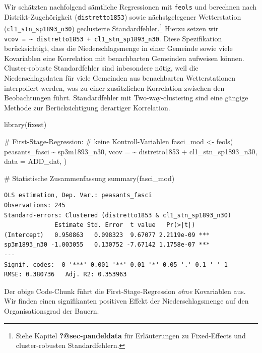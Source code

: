 \documentclass[
  a4paper,
  DIV=11,
  oneside]{scrreprt}
\newenvironment{Shaded}{\begin{snugshade}}{\end{snugshade}}
\newcommand{\AttributeTok}[1]{\textcolor[rgb]{0.40,0.45,0.13}{#1}}
\newcommand{\CommentTok}[1]{\textcolor[rgb]{0.37,0.37,0.37}{#1}}
\newcommand{\FunctionTok}[1]{\textcolor[rgb]{0.28,0.35,0.67}{#1}}
\newcommand{\NormalTok}[1]{\textcolor[rgb]{0.00,0.23,0.31}{#1}}
\newcommand{\OtherTok}[1]{\textcolor[rgb]{0.00,0.23,0.31}{#1}}
\newcommand{\SpecialCharTok}[1]{\textcolor[rgb]{0.37,0.37,0.37}{#1}}
\begin{document}
Wir schätzten nachfolgend sämtliche Regressionen mit \texttt{feols} und
berechnen nach Distrikt-Zugehörigkeit (\texttt{distretto1853}) sowie
nächstgelegener Wetterstation (\texttt{cl1\_stn\_sp1893\_n30})
geclusterte Standardfehler.\footnote{Siehe Kapitel
  \textbf{?@sec-pandeldata} für Erläuterungen zu Fixed-Effects und
  cluster-robusten Standardfehlern.} Hierzu setzen wir
\texttt{vcov\ =\ \textasciitilde{}\ distretto1853\ +\ cl1\_stn\_sp1893\_n30}.
Diese Spezifikation berücksichtigt, dass die Niederschlagsmenge in einer
Gemeinde sowie viele Kovariablen eine Korrelation mit benachbarten
Gemeinden aufweisen können. Cluster-robuste Standardfehler sind
inbesondere nötig, weil die Niederschlagsdaten für viele Gemeinden aus
benachbarten Wetterstationen interpoliert werden, was zu einer
zusätzlichen Korrelation zwischen den Beobachtungen führt.
Standardfehler mit Two-way-clustering sind eine gängige Methode zur
Berücksichtigung derartiger Korrelation.

\begin{Shaded}
\begin{Highlighting}[]
\FunctionTok{library}\NormalTok{(fixest)}

\CommentTok{\# First{-}Stage{-}Regression:}
\CommentTok{\# keine Kontroll{-}Variablen}
\NormalTok{fasci\_mod }\OtherTok{\textless{}{-}} \FunctionTok{feols}\NormalTok{(}
\NormalTok{  peasants\_fasci }\SpecialCharTok{\textasciitilde{}}\NormalTok{ sp3m1893\_n30, }
  \AttributeTok{vcov =} \SpecialCharTok{\textasciitilde{}}\NormalTok{ distretto1853 }\SpecialCharTok{+}\NormalTok{ cl1\_stn\_sp1893\_n30,}
  \AttributeTok{data =}\NormalTok{ ADD\_dat,}
\NormalTok{  )}

\CommentTok{\# Statistische Zusammenfassung}
\FunctionTok{summary}\NormalTok{(fasci\_mod)}
\end{Highlighting}
\end{Shaded}

\begin{verbatim}
OLS estimation, Dep. Var.: peasants_fasci
Observations: 245
Standard-errors: Clustered (distretto1853 & cl1_stn_sp1893_n30) 
              Estimate Std. Error  t value   Pr(>|t|)    
(Intercept)   0.950863   0.098323  9.67077 2.2119e-09 ***
sp3m1893_n30 -1.003055   0.130752 -7.67142 1.1758e-07 ***
---
Signif. codes:  0 '***' 0.001 '**' 0.01 '*' 0.05 '.' 0.1 ' ' 1
RMSE: 0.380736   Adj. R2: 0.353963
\end{verbatim}

Der obige Code-Chunk führt die First-Stage-Regression \emph{ohne}
Kovariablen aus. Wir finden einen signifikanten positiven Effekt der
Niederschlagsmenge auf den Organisationsgrad der Bauern.
\end{document}
